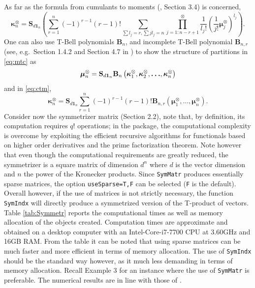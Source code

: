 As far as the formula from cumulants to moments (\citet{terdik2021multivariate}, Section 3.4) is concerned,
\begin{equation}
\boldsymbol{\kappa}_{n}^\otimes  
  = \mathbf{S}_{d \mathbf{1}_n}\left( \sum_{r=1}^n (-1)^{r-1} (r-1)!\sum_{\sum l_j =r, \sum j l_j = n}  \prod_{j=1:n-r+1}^\otimes \frac{1}{{l_j}!}\left( \frac{1}{j!}\boldsymbol{\mu}^{\otimes}_j\right)^{l_j}\right).
\label{eq:ctm}
\end{equation}
One can also use T-Bell polynomials \(\mathbf{B}_{n}\), and incomplete T-Bell polynomial \(\mathbf{B}_{n,r}\) (see, e.g.~Section 1.4.2 and Section 4.7 in \citet{terdik2021multivariate})
to show the structure of partitions in \eqref{eq:mtc} as
\begin{equation}
\boldsymbol{\mu }_{n}^{\otimes }=\mathbf{S}_{d \mathbf{1}_n} \mathbf{B}_{n}\left( \boldsymbol{%
\kappa }_{1}^{\otimes },\boldsymbol{\kappa }_{2}^{\otimes },\boldsymbol{\ldots },\boldsymbol{\kappa }_{n}^{\otimes }\right)
\end{equation}
and in \eqref{eq:ctm},
\begin{equation}
\boldsymbol{\kappa }_{n}^{\otimes }= \mathbf{S}_{d \mathbf{1}_n} \sum_{r=1}^{n}\left(
-1\right) ^{r-1}(r-1)!\mathbf{B}_{n,r}\left( \boldsymbol{\mu }_{1}^{\otimes },\boldsymbol{\ldots },\boldsymbol{\mu }_{n}^{\otimes }\right). 
\end{equation}
Consider now the symmetrizer matrix (Section 2.2), note that, by definition, its computation requires \(q!\) operations; in the package, the computational complexity is overcome by exploiting the \citet{Chacon2014} efficient recursive algorithms for functionals based on higher order derivatives and the prime factorization theorem. Note however that even though the computational requirements are greatly reduced, the symmetrizer is a square matrix of dimension \(d^n\) where \(d\) is the vector dimension and \(n\) the power of the Kronecker products. Since \texttt{SymMatr} produces essentially sparse matrices, the option \texttt{useSparse=T,F} can be selected (\texttt{F} is the default). Overall however, if the use of matrices is not strictly necessary, the function \texttt{SymIndx} will directly produce a symmetrized version of the T-product of vectors. Table \ref{tab:Symmetr} reports the computational times as well as memory allocation of the objects created. Computation times are approximate and obtained on a desktop computer with an Intel-Core-i7-7700 CPU at 3.60GHz and 16GB RAM. From the table it can be noted that using sparse matrices can be much faster and more efficient in terms of memory allocation. The use of \texttt{SymIndx} should be the standard way however, as it much less demanding in terms of memory allocation. Recall Example 3 for an instance where the use of \texttt{SymMatr} is preferable. The numerical results are in line with those of \citet{Chacon2014}.

